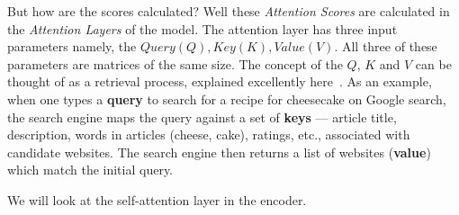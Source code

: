 But how are the scores calculated? Well these \emph{Attention Scores} are calculated in the \emph{Attention Layers} of the model.
The attention layer has three input parameters namely, the $Query (Q), Key (K), Value (V)$. All three of these parameters
are matrices of the same size. The concept of the $Q$, $K$ and $V$ can be thought of as a retrieval process, explained excellently here~\autocite{emilAnswerWhatExactly2020}.
\bigbreak
As an example, when one types a \textbf{query} to search for a recipe for cheesecake on Google search, the search engine maps the query against a set
of \textbf{keys} --- article title, description, words in articles (cheese, cake), ratings, etc., associated with candidate websites.
The search engine then returns a list of websites (\textbf{value}) which match the initial query.


\bigbreak
We will look at the self-attention layer in the encoder.
